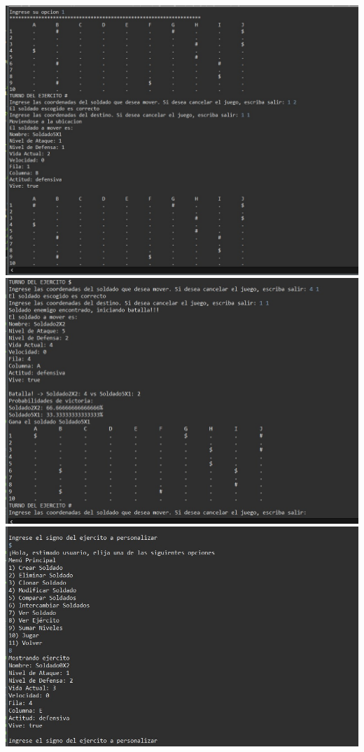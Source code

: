 \documentclass{article}
\begin{document}
\includegraphics[scale=0.50]{img/captura 3.jpeg} 
\includegraphics[scale=0.50]{img/captura 4.jpeg} 
\includegraphics[scale=0.50]{img/captura 5.jpeg} 
\end{document}
